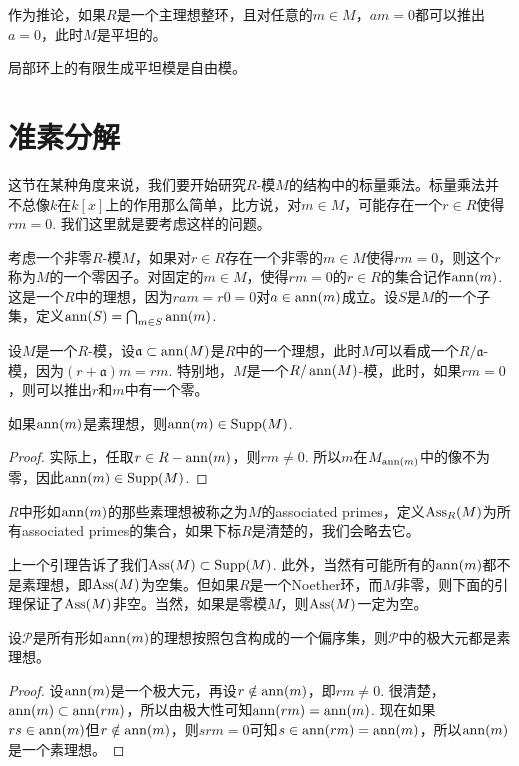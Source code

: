 作为推论，如果$R$是一个主理想整环，且对任意的$m\in M$，$am=0$都可以推出$a=0$，此时$M$是平坦的。

\begin{pro}
	局部环上的有限生成平坦模是自由模。
\end{pro}

\section{准素分解}

这节在某种角度来说，我们要开始研究$R$-模$M$的结构中的标量乘法。标量乘法并不总像$k$在$k[x]$上的作用那么简单，比方说，对$m\in M$，可能存在一个$r\in R$使得$rm=0$. 我们这里就是要考虑这样的问题。

\para[零因子] 考虑一个非零$R$-模$M$，如果对$r\in R$存在一个非零的$m\in M$使得$rm=0$，则这个$r$称为$M$的一个零因子。对固定的$m\in M$，使得$rm=0$的$r\in R$的集合记作$\operatorname{ann}(m)$. 这是一个$R$中的理想，因为$ram=r0=0$对$a\in \operatorname{ann}(m)$成立。设$S$是$M$的一个子集，定义$\operatorname{ann}(S)=\bigcap_{m\in S}\operatorname{ann}(m)$.\endpara

设$M$是一个$R$-模，设$\mathfrak{a}\subset \operatorname{ann}(M)$是$R$中的一个理想，此时$M$可以看成一个$R/\mathfrak{a}$-模，因为$(r+\mathfrak{a})m=rm$. 特别地，$M$是一个$R/\operatorname{ann}(M)$-模，此时，如果$rm=0$，则可以推出$r$和$m$中有一个零。

\begin{lem}
	如果$\operatorname{ann}(m)$是素理想，则$\operatorname{ann}(m)\in \operatorname{Supp}(M)$.
\end{lem}

\begin{proof}
	实际上，任取$r\in R-\operatorname{ann}(m)$，则$rm\neq 0$. 所以$m$在$M_{\operatorname{ann}(m)}$中的像不为零，因此$\operatorname{ann}(m)\in \operatorname{Supp}(M)$.
\end{proof}

\para $R$中形如$\operatorname{ann}(m)$的那些素理想被称之为$M$的associated primes，定义$\operatorname{Ass}_R(M)$为所有associated primes的集合，如果下标$R$是清楚的，我们会略去它。
\endpara

上一个引理告诉了我们$\operatorname{Ass}(M)\subset \operatorname{Supp}(M)$. 此外，当然有可能所有的$\operatorname{ann}(m)$都不是素理想，即$\operatorname{Ass}(M)$为空集。但如果$R$是一个Noether环，而$M$非零，则下面的引理保证了$\operatorname{Ass}(M)$非空。当然，如果是零模$M$，则$\operatorname{Ass}(M)$一定为空。

\begin{lem}
设$\mathcal{P}$是所有形如$\operatorname{ann}(m)$的理想按照包含构成的一个偏序集，则$\mathcal{P}$中的极大元都是素理想。
\end{lem}

\begin{proof}
	设$\operatorname{ann}(m)$是一个极大元，再设$r\notin \operatorname{ann}(m)$，即$rm\neq 0$. 很清楚，$\operatorname{ann}(m)\subset \operatorname{ann}(rm)$，所以由极大性可知$\operatorname{ann}(rm)=\operatorname{ann}(m)$. 现在如果$rs\in \operatorname{ann}(m)$但$r\notin \operatorname{ann}(m)$，则$srm=0$可知$s\in \operatorname{ann}(rm)=\operatorname{ann}(m)$，所以$\operatorname{ann}(m)$是一个素理想。
\end{proof}

